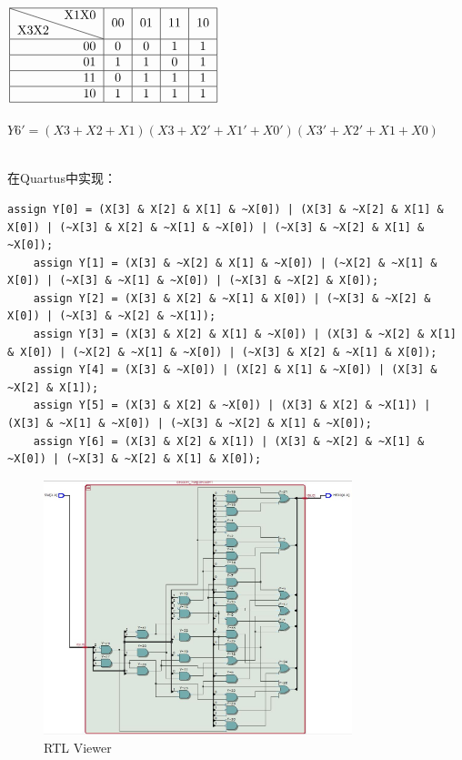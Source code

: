 \documentclass[12pt,a4paper,UTF8]{article}
\begin{document}
{$\left.
  \begin{tabular}[H]{|r|c|c|c|c|}
    \hline
    \diagbox{X3X2}{X1X0} & 00 & 01 & 11 & 10 \\ \hline
    00                   & 0  & 0  & 1  & 1  \\ \hline
    01                   & 1  & 1  & 0  & 1  \\ \hline
    11                   & 0  & 1  & 1  & 1  \\ \hline
    10                   & 1  & 1  & 1  & 1  \\ \hline
  \end{tabular}
  \right.$\\ \\
$Y6' = (X3 + X2 + X1) (X3 + X2' + X1' + X0') (X3' + X2' + X1 + X0)$
\\ \\
}

在Quartus中实现：
\begin{lstlisting}[style=verilog-style]
	assign Y[0] = (X[3] & X[2] & X[1] & ~X[0]) | (X[3] & ~X[2] & X[1] & X[0]) | (~X[3] & X[2] & ~X[1] & ~X[0]) | (~X[3] & ~X[2] & X[1] & ~X[0]);
	assign Y[1] = (X[3] & ~X[2] & X[1] & ~X[0]) | (~X[2] & ~X[1] & X[0]) | (~X[3] & ~X[1] & ~X[0]) | (~X[3] & ~X[2] & X[0]);
	assign Y[2] = (X[3] & X[2] & ~X[1] & X[0]) | (~X[3] & ~X[2] & X[0]) | (~X[3] & ~X[2] & ~X[1]);
	assign Y[3] = (X[3] & X[2] & X[1] & ~X[0]) | (X[3] & ~X[2] & X[1] & X[0]) | (~X[2] & ~X[1] & ~X[0]) | (~X[3] & X[2] & ~X[1] & X[0]);
	assign Y[4] = (X[3] & ~X[0]) | (X[2] & X[1] & ~X[0]) | (X[3] & ~X[2] & X[1]);
	assign Y[5] = (X[3] & X[2] & ~X[0]) | (X[3] & X[2] & ~X[1]) | (X[3] & ~X[1] & ~X[0]) | (~X[3] & ~X[2] & X[1] & ~X[0]);
	assign Y[6] = (X[3] & X[2] & X[1]) | (X[3] & ~X[2] & ~X[1] & ~X[0]) | (~X[3] & ~X[2] & X[1] & X[0]);
\end{lstlisting}

\begin{figure}[H]
  \centering
  \includegraphics[width=0.8\textwidth]{2_2_3RTL.JPG}
  \caption{RTL Viewer}
  \label{7seg_RTL}
\end{figure}
\hspace*{\fill} \\
\end{document}

